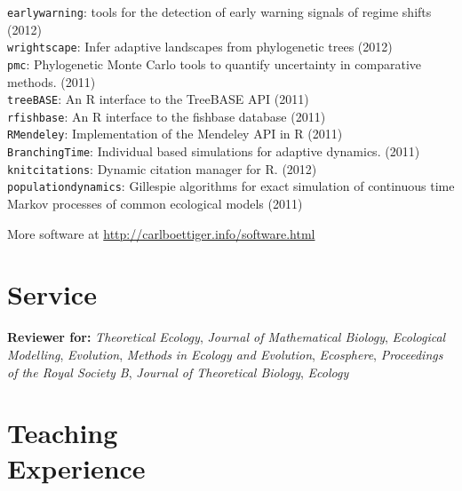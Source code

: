 \documentclass[margin]{res}
\begin{document}
\begin{resume}
\texttt{earlywarning}: tools for the detection of early warning signals of regime shifts (2012)\\
\texttt{wrightscape}: Infer adaptive landscapes from phylogenetic trees (2012) \\
\texttt{pmc}: Phylogenetic Monte Carlo tools to quantify uncertainty in comparative methods. (2011)\\
\texttt{treeBASE}: An R interface to the TreeBASE API (2011) \\
\texttt{rfishbase}: An R interface to the fishbase database (2011) \\
\texttt{RMendeley}: Implementation of the Mendeley API in R (2011) \\
\texttt{BranchingTime}: Individual based simulations for adaptive dynamics. (2011) \\
\texttt{knitcitations}: Dynamic citation manager for R. (2012) \\
\texttt{populationdynamics}: Gillespie algorithms for exact simulation of continuous time Markov processes of common ecological models (2011) 

More software at \href{http://carlboettiger.info/software.html}{http://carlboettiger.info/software.html}

\section{Service}

\textbf{Reviewer for:}   \emph{Theoretical Ecology}, \emph{Journal of Mathematical Biology}, \emph{Ecological Modelling},
\emph{Evolution}, \emph{Methods in Ecology and Evolution}, \emph{Ecosphere}, \emph{Proceedings of the Royal Society B}, \emph{Journal of Theoretical Biology}, \emph{Ecology} 


\section{Teaching\\Experience}
\begin{format}
\\
\end{format}

\begin{position}
\end{position}


\begin{position}
\end{position}


\end{resume}
\end{document}
